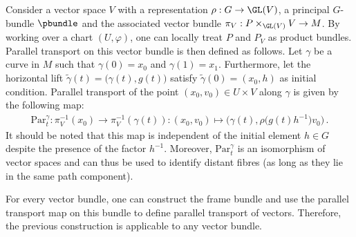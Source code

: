     \begin{example}
        Consider a vector space $V$ with a representation $\rho:G\rightarrow\GL(V)$, a principal $G$-bundle $\pbundle$ and the associated vector bundle $\pi_V:P\times_{\GL(V)}V\rightarrow M$. By working over a chart $(U,\varphi)$, one can locally treat $P$ and $P_V$ as product bundles. Parallel transport on this vector bundle is then defined as follows. Let $\gamma$ be a curve in $M$ such that $\gamma(0)=x_0$ and $\gamma(1)=x_1$. Furthermore, let the horizontal lift $\widetilde{\gamma}(t)=\big(\gamma(t),g(t)\big)$ satisfy $\widetilde{\gamma}(0)=(x_0,h)$ as initial condition. Parallel transport of the point $(x_0,v_0)\in U\times V$ along $\gamma$ is given by the following map:
        \begin{gather}
            \mathrm{Par}^\gamma_t:\pi^{-1}_V(x_0)\rightarrow\pi^{-1}_V(\gamma(t)):(x_0, v_0)\mapsto\bigl(\gamma(t),\rho\bigl(g(t)h^{-1}\bigr)v_0\bigr)\,.
        \end{gather}
        It should be noted that this map is independent of the initial element $h\in G$ despite the presence of the factor $h^{-1}$. Moreover, $\mathrm{Par}^\gamma_t$ is an isomorphism of vector spaces and can thus be used to identify distant fibres (as long as they lie in the same path component).
    \end{example}
    \begin{remark}
        For every vector bundle, one can construct the frame bundle and use the parallel transport map on this bundle to define parallel transport of vectors. Therefore, the previous construction is applicable to any vector bundle.
    \end{remark}

